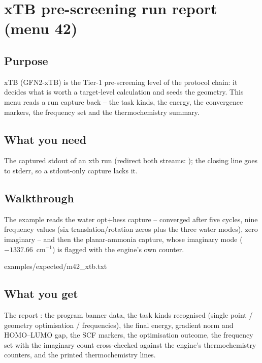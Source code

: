 \chapter{xTB pre-screening run report (menu 42)}
\label{ch:menu42}

\section{Purpose}

xTB (GFN2-xTB) is the Tier-1 pre-screening level of the protocol chain:
it decides what is worth a target-level calculation and seeds the geometry.
This menu reads a run capture back -- the task kinds, the energy, the
convergence markers, the frequency set and the thermochemistry summary.

\section{What you need}

The captured stdout of an xtb run (redirect both streams:
); the closing
 line goes to stderr, so a stdout-only
capture lacks it.

\section{Walkthrough}

The example reads the water opt+hess capture -- converged after five
cycles, nine frequency values (six translation/rotation zeros plus the
three water modes), zero imaginary -- and then the planar-ammonia capture,
whose imaginary mode ($-1337.66$~cm$^{-1}$) is flagged with the engine's
own counter.


  {examples/expected/m42_xtb.txt}

\section{What you get}

The report : the program banner data, the task
kinds recognised (single point / geometry optimisation / frequencies),
the final energy, gradient norm and HOMO--LUMO gap, the SCF markers, the
optimisation outcome, the frequency set with the imaginary count
cross-checked against the engine's thermochemistry counters, and the
printed thermochemistry lines.

